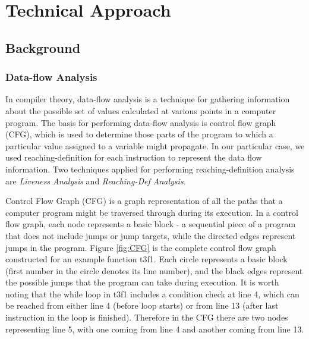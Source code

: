 \chapter{Technical Approach}

\section{Background}
\subsection{Data-flow Analysis}
In compiler theory, data-flow analysis is a technique for gathering information about the possible set of values calculated at various points in a computer program. The basis for performing data-flow analysis is control flow graph (CFG), which is used to determine those parts of the program to which a particular value assigned to a variable might propagate. In our particular case, we used reaching-definition for each instruction to represent the data flow information. Two techniques applied for performing reaching-definition analysis are \textit{Liveness Analysis} and \textit{Reaching-Def Analysis}.

Control Flow Graph (CFG) is a graph representation of all the paths that a computer program might be traversed through during its execution. In a control flow graph, each node represents a basic block - a sequential piece of a program that does not include jumps or jump targets, while the directed edges represent jumps in the program. Figure \ref{fig:CFG} is the complete control flow graph constructed for an example function t3f1. Each circle represents a basic block (first number in the circle denotes its line number), and the black edges represent the possible jumps that the program can take during execution. It is worth noting that the while loop in t3f1 includes a condition check at line 4, which can be reached from either line 4 (before loop starts) or from line 13 (after last instruction in the loop is finished). Therefore in the CFG there are two nodes representing line 5, with one coming from line 4 and another coming from line 13.

